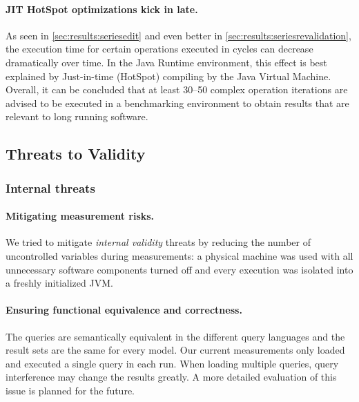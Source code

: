 \paragraph{JIT HotSpot optimizations kick in late.}
As seen in \autoref{sec:results:seriesedit} and even better in \autoref{sec:results:seriesrevalidation}, the execution time for certain operations executed in cycles can decrease dramatically over time. In the Java Runtime environment, this effect is best explained by Just-in-time (HotSpot) compiling by the Java Virtual Machine. Overall, it can be concluded that at least 30--50 complex operation iterations are advised to be executed in a benchmarking environment to obtain results that are relevant to long running software.

\subsection{Threats to Validity}

\subsubsection{Internal threats}

\paragraph{Mitigating measurement risks.}
We tried to mitigate \emph{internal validity} threats by reducing the number of uncontrolled variables during measurements: a physical machine was used with all unnecessary software components turned off and every execution was isolated into a freshly initialized JVM.

\paragraph{Ensuring functional equivalence and correctness.}
The queries are semantically equivalent in the different query languages and the result sets are the same for every model. Our current measurements only loaded and executed a single query in each run. When loading multiple queries, query interference may change the results greatly. A more detailed evaluation of this issue is planned for the future.


